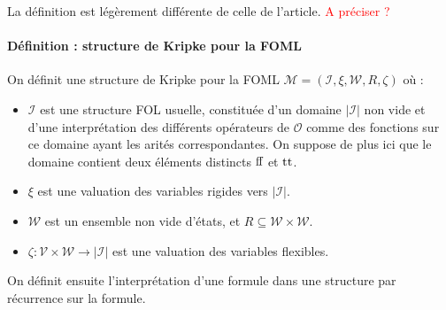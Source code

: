 \documentclass[12pt]{article}
\newcommand{\false}{\textup{ff}}
\newcommand{\true}{\textup{tt}}
\newcommand{\M}{\ensuremath{\mathcal{M}}}
\newcommand{\I}{\ensuremath{\mathcal{I}}}
\newcommand{\raph}[1]{\textcolor{red}{#1}}
\begin{document}
La définition est légèrement différente de celle de l'article. \raph{A préciser ?}

\paragraph{Définition : structure de Kripke pour la FOML}
On définit une structure de Kripke pour la FOML $\M = (\I, \xi, \mathcal{W}, R, \zeta)$ où :
\begin{itemize}
\item
  $\I$ est une structure FOL usuelle, constituée d'un domaine $|\I|$ non vide et d'une interprétation des différents opérateurs de $\mathcal{O}$ comme des fonctions sur ce domaine ayant les arités correspondantes.
  On suppose de plus ici que le domaine contient deux éléments distincts $\false$ et $\true$.
\item
  $\xi$ est une valuation des variables rigides vers $|\I|$.
\item
  $\mathcal{W}$ est un ensemble non vide d'états, et $R \subseteq \mathcal{W} \times \mathcal{W}$.
\item
  $\zeta : \mathcal{V} \times \mathcal{W} \to |\I|$ est une valuation des variables flexibles.
\end{itemize}

\medskip

On définit ensuite l'interprétation d'une formule dans une structure par récurrence sur la formule.
\end{document}

